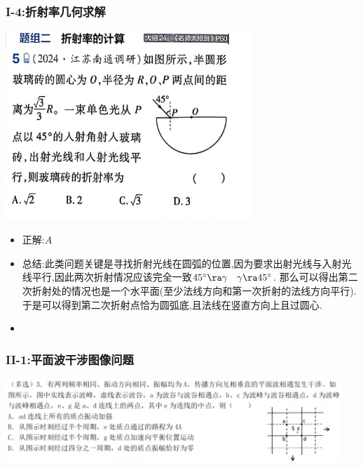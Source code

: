 \documentclass{article}
\begin{document}
\subsubsection{I-4:折射率几何求解}
\includegraphics[width = 25em]{./pictures/2.1-9.png}

\begin{itemize}
    \item 正解:\quad $A$
    \item 总结:\quad 此类问题关键是寻找折射光线在圆弧的位置,因为要求出射光线与入射光线平行,因此两次折射情况应该完全一致$45^\circ \ra \gamma \quad \gamma \ra 45^\circ$.
          那么可以得出第二次折射处的情况也是一个水平面(至少法线方向和第一次折射的法线方向平行).于是可以得到第二次折射点恰为圆弧底,且法线在竖直方向上且过圆心.
    \item
\end{itemize}


\vspace{2em}

\subsubsection{II-1:平面波干涉图像问题}
\includegraphics[width = 0.95\textwidth]{./pictures/2.1-3.png}
\end{document}
